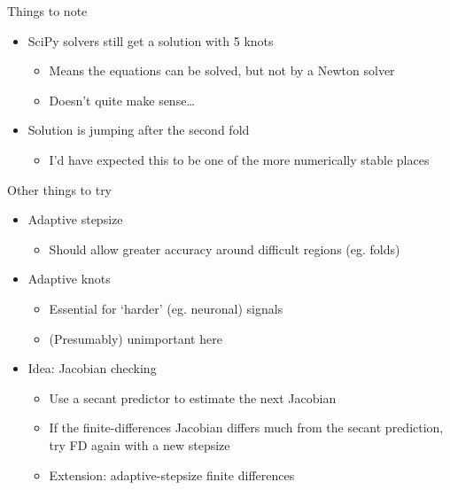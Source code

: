 \documentclass[presentation]{beamer}
\begin{document}
\begin{frame}[label={sec:orga435a3a}]{Things to note}
\begin{itemize}
\item SciPy solvers still get a solution with 5 knots
\begin{itemize}
\item Means the equations can be solved, but not by a Newton solver
\item Doesn't quite make sense\ldots{}
\end{itemize}
\end{itemize}

\vfill
\begin{itemize}
\item Solution is jumping after the second fold
\begin{itemize}
\item I'd have expected this to be one of the more numerically stable places
\end{itemize}
\end{itemize}
\end{frame}

\begin{frame}[label={sec:orgc15725d}]{Other things to try}
\begin{itemize}
\item Adaptive stepsize
\begin{itemize}
\item Should allow greater accuracy around difficult regions (eg. folds)
\end{itemize}
\end{itemize}
\vfill
\begin{itemize}
\item Adaptive knots
\begin{itemize}
\item Essential for `harder' (eg. neuronal) signals
\item (Presumably) unimportant here
\end{itemize}
\end{itemize}
\vfill
\begin{itemize}
\item Idea: Jacobian checking
\begin{itemize}
\item Use a secant predictor to estimate the next Jacobian
\item If the finite-differences Jacobian differs much from the secant prediction, try FD again with a new stepsize
\item Extension: adaptive-stepsize finite differences
\end{itemize}
\end{itemize}
\end{frame}
\end{document}
